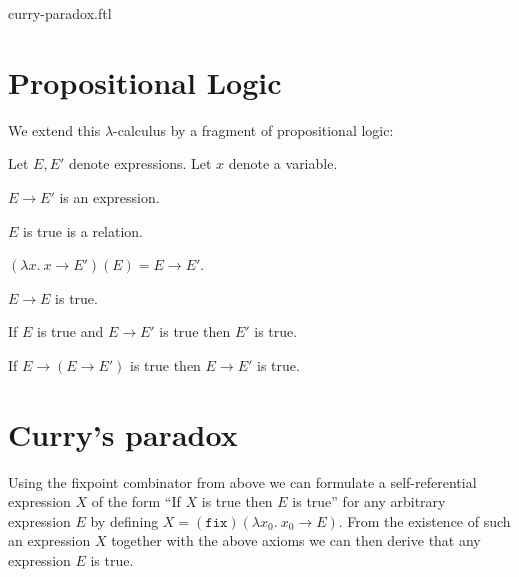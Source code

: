 \documentclass{article}
\newcommand{\varzero}{x_0}
\newcommand{\abs}[2]{\lambda#1.\ #2}
\newcommand{\app}[2]{(#1)(#2)}
\newcommand{\fix}{\texttt{fix}}
\begin{document}
\begin{smodule}{curry-paradox.ftl}
\section*{Propositional Logic}

\noindent We extend this $\lambda$-calculus by a fragment of propositional
logic:

\begin{forthel}  
  Let $E, E'$ denote expressions.
  Let $x$ denote a variable.

  \begin{signature*}[title=Implication,id=implication]
    $E \rightarrow E'$ is an expression.
  \end{signature*}

  \begin{signature*}[title=Truth,id=truth]
    $E$ is true is a relation.
  \end{signature*}

  \begin{axiom*}[title=$\beta$-reduction,id=beta_reduction]
    $\app{\abs{x}{x \rightarrow E'}}{E} = E \rightarrow E'$.
  \end{axiom*}

  \begin{axiom*}[title=Reflexivity,id=reflexivity]
    $E \rightarrow E$ is true.
  \end{axiom*}

  \begin{axiom*}[title=Modus Ponens,id=modus_ponens]
    If $E$ is true and $E \rightarrow E'$ is true then $E'$ is true.
  \end{axiom*}

  \begin{axiom*}[title=Strengthening,id=strengthening]
    If $E \rightarrow (E \rightarrow E')$ is true then $E \rightarrow E'$ is true.
  \end{axiom*}
\end{forthel}


\section*{Curry's paradox}

\noindent Using the fixpoint combinator from above we can formulate a 
self-referential expression $X$ of the form ``If $X$ is true then $E$ is
true'' for any arbitrary expression $E$ by defining
$X = \app{\fix}{\abs{\varzero}{\varzero \rightarrow E}}$.
From the existence of such an expression $X$ together with the above axioms 
we can then derive that any expression $E$ is true.


\end{smodule}
\end{document}
